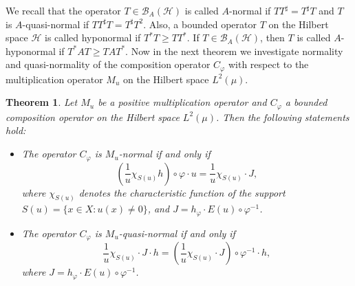 \documentclass{amsart}
\newtheorem{thm}{Theorem}[section]
\theoremstyle{definition}\newtheorem{defn}[thm]{Definition}
\theoremstyle{remark}
\numberwithin{equation}{section}
\begin{document}
We recall that the operator $T\in\mathcal{B}_A(\mathcal{H})$ is called $A$-normal if $TT^{\sharp}=T^{\sharp}T$ and $T$ is $A$-quasi-normal if $TT^{\sharp}T=T^{\sharp}T^2$. Also, a bounded operator $T$ on the Hilbert space $\mathcal{H}$ is called hyponormal if $T^*T\geq TT^*$. If $T\in\mathcal{B}_A(\mathcal{H})$, then $T$ is called  $A$-hyponormal if $T^*AT\geq TAT^*$. Now in the next theorem we investigate normality and quasi-normality of the composition operator $C_{\varphi}$ with respect to the multiplication operator $M_u$ on the Hilbert space $L^2(\mu)$. 
\begin{thm}\label{t15}
Let \( M_u \) be a positive multiplication operator and \( C_{\varphi} \) a bounded composition operator on the Hilbert space \( L^2(\mu) \). Then the following statements hold:

\begin{itemize}
    \item[(a)] The operator \( C_{\varphi} \) is \( M_u \)-normal if and only if
    \[
    \left( \frac{1}{u} \chi_{S(u)} h \right) \circ \varphi \cdot u = \frac{1}{u} \chi_{S(u)} \cdot J,
    \]
    where \( \chi_{S(u)} \) denotes the characteristic function of the support \( S(u) = \{ x \in X : u(x) \neq 0 \} \), and \( J = h_{\varphi}  \cdot E(u) \circ \varphi^{-1} \).

    \item[(b)] The operator \( C_{\varphi} \) is \( M_u \)-quasi-normal if and only if
    \[
    \frac{1}{u} \chi_{S(u)} \cdot J \cdot h = \left( \frac{1}{u} \chi_{S(u)} \cdot J \right) \circ \varphi^{-1} \cdot h,
    \]
    where \( J = h_{\varphi}  \cdot E(u) \circ \varphi^{-1} \).
\end{itemize}
\end{thm}
\end{document}
